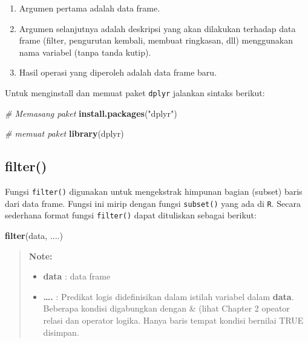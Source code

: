 \documentclass[]{book}
\newenvironment{Shaded}{\begin{snugshade}}{\end{snugshade}}
\newcommand{\KeywordTok}[1]{\textcolor[rgb]{0.13,0.29,0.53}{\textbf{#1}}}
\newcommand{\StringTok}[1]{\textcolor[rgb]{0.31,0.60,0.02}{#1}}
\newcommand{\CommentTok}[1]{\textcolor[rgb]{0.56,0.35,0.01}{\textit{#1}}}
\newcommand{\NormalTok}[1]{#1}
\providecommand{\tightlist}{%
  \setlength{\itemsep}{0pt}\setlength{\parskip}{0pt}}
\begin{document}
\begin{enumerate}
\def\labelenumi{\arabic{enumi}.}
\tightlist
\item
  Argumen pertama adalah data frame.
\item
  Argumen selanjutnya adalah deskripsi yang akan dilakukan terhadap data
  frame (filter, pengurutan kembali, membuat ringkasan, dll) menggunakan
  nama variabel (tanpa tanda kutip).
\item
  Hasil operasi yang diperoleh adalah data frame baru.
\end{enumerate}

Untuk menginstall dan memuat paket \texttt{dplyr} jalankan sintaks
berikut:

\begin{Shaded}
\begin{Highlighting}[]
\CommentTok{# Memasang paket}
\KeywordTok{install.packages}\NormalTok{(}\StringTok{"dplyr"}\NormalTok{)}
\end{Highlighting}
\end{Shaded}

\begin{Shaded}
\begin{Highlighting}[]
\CommentTok{# memuat paket}
\KeywordTok{library}\NormalTok{(dplyr)}
\end{Highlighting}
\end{Shaded}

\subsection{filter()}\label{filter}

Fungsi \texttt{filter()} digunakan untuk mengekstrak himpunan bagian
(subset) baris dari data frame. Fungsi ini mirip dengan fungsi
\texttt{subset()} yang ada di \texttt{R}. Secara sederhana format fungsi
\texttt{filter()} dapat dituliskan sebagai berikut:

\begin{Shaded}
\begin{Highlighting}[]
\KeywordTok{filter}\NormalTok{(data, ....)}
\end{Highlighting}
\end{Shaded}

\begin{quote}
\textbf{Note: }

\begin{itemize}
\tightlist
\item
  \textbf{data} : data frame
\item
  \textbf{\ldots{}.} : Predikat logis didefinisikan dalam istilah
  variabel dalam \textbf{data}. Beberapa kondisi digabungkan dengan \&
  (lihat Chapter 2 opeator relasi dan operator logika. Hanya baris
  tempat kondisi bernilai TRUE disimpan.
\end{itemize}
\end{quote}
\end{document}
